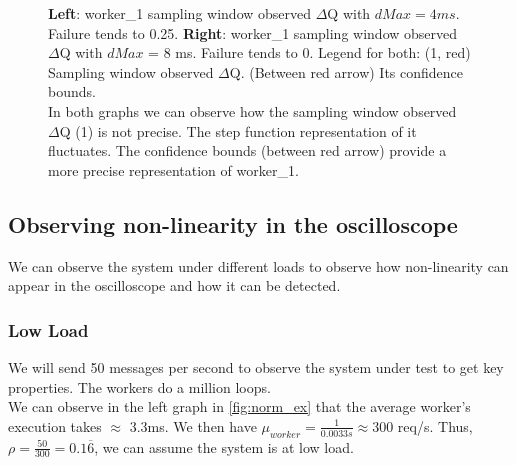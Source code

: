 \begin{figure}[H]
\begin{subfigure}{.5\textwidth}
                \label{fig:w18}
            \end{subfigure}
            \caption{\textbf{Left}: worker\_1 sampling window observed $\Delta$Q with $dMax = 4ms$. Failure tends to 0.25. \textbf{Right}: worker\_1 sampling window observed $\Delta$Q with $dMax$ = 8 ms. Failure tends to 0. Legend for both: (1, red) Sampling window observed $\Delta$Q. (Between red arrow) Its confidence bounds.\\
            In both graphs we can observe how the sampling window observed $\Delta$Q (1) is not precise. The step function representation of it fluctuates. The confidence bounds (between red arrow) provide a more precise representation of worker\_1.}%
            \label{fig:w1w2hb}
            \end{figure}
    \subsection{Observing non-linearity in the oscilloscope}
    We can observe the system under different loads to observe how non-linearity can appear in the oscilloscope and how it can be detected. 
    \subsubsection{Low Load} 
   We will send 50 messages per second to observe the system under test to get key properties. The workers do a million loops. \\
    We can observe in the left graph in \cref{fig:norm_ex} that the average worker's execution takes $\approx$ 3.3ms. We then have $\mu_{worker} = \frac{1}{0.0033 s} \approx 300$ req/s. Thus, $\rho = \frac{50}{300} = 0.1\overline{6}$, we can assume the system is at low load.

